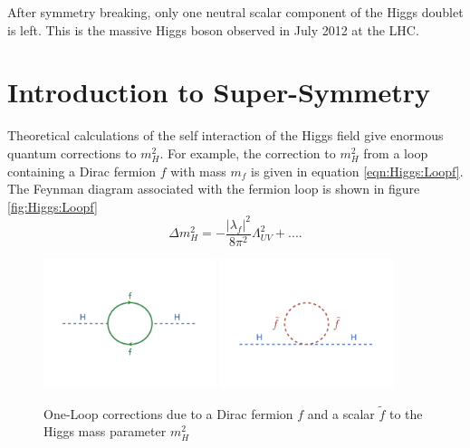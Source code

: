 \indent After symmetry breaking, only one neutral scalar component of the Higgs doublet is left.  This is the massive Higgs boson observed in July 2012 at the LHC.  \\

\section{Introduction to Super-Symmetry}
\label{Theory:QFT}


\indent Theoretical calculations of the self interaction of the Higgs field give enormous quantum corrections to $m_H^2$.\cite{MartinSUSY}  For example, the correction to $m_H^2$ from a loop containing a Dirac fermion $f$ with mass $m_f$ is given in equation \ref{eqn:Higgs:Loopf}.  The Feynman diagram associated with the fermion loop is shown in figure \ref{fig:Higgs:Loopf} \\

\begin{equation}
\label{eqn:Higgs:Loopf}
\Delta m_H^2 = - \frac{|\lambda_f|^2}{8\pi^2}\Lambda^2_{UV} + ....
\end{equation}

\begin{figure}[htbp]
	\begin{center}
		\includegraphics[width=0.45\textwidth]{figures/theory/loopf.png}
		\includegraphics[width=0.45\textwidth]{figures/theory/loopS.png}
		\caption{One-Loop corrections due to a Dirac fermion $f$ and a scalar $\tilde{f}$ to the Higgs mass parameter $m_H^2$}
		\label{fig:SM:Loopf}
	\end{center}
\end{figure}

